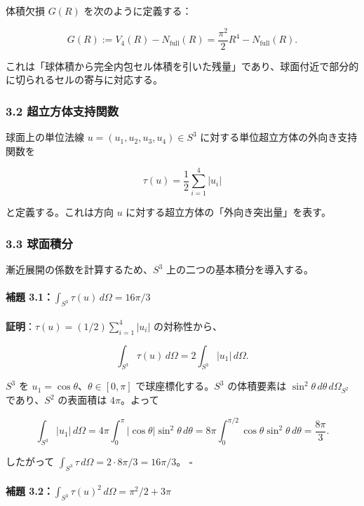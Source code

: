 \documentclass[
]{article}
\begin{document}
体積欠損 \(G(R)\) を次のように定義する：

\[G(R) := V_4(R) - N_{\text{full}}(R) = \frac{\pi^2}{2}R^4 - N_{\text{full}}(R). \tag{3.1}\]

これは「球体積から完全内包セル体積を引いた残量」であり、球面付近で部分的に切られるセルの寄与に対応する。

\subsubsection{3.2
超立方体支持関数}\label{ux8d85ux7acbux65b9ux4f53ux652fux6301ux95a2ux6570}

球面上の単位法線 \(u = (u_1, u_2, u_3, u_4) \in S^3\)
に対する単位超立方体の外向き支持関数を

\[\tau(u) = \frac{1}{2}\sum_{i=1}^{4} |u_i| \tag{3.2}\]

と定義する。これは方向 \(u\) に対する超立方体の「外向き突出量」を表す。

\subsubsection{3.3 球面積分}\label{ux7403ux9762ux7a4dux5206}

漸近展開の係数を計算するため、\(S^3\) 上の二つの基本積分を導入する。

\paragraph{\texorpdfstring{補題
3.1：\(\int_{S^3} \tau(u) \, d\Omega = 16\pi/3\)}{補題 3.1：\textbackslash int\_\{S\^{}3\} \textbackslash tau(u) \textbackslash, d\textbackslash Omega = 16\textbackslash pi/3}}\label{ux88dcux984c-3.1int_s3-tauu-domega-16pi3}

\textbf{証明}：\(\tau(u) = (1/2)\sum_{i=1}^4 |u_i|\) の対称性から、

\[\int_{S^3} \tau(u) \, d\Omega = 2 \int_{S^3} |u_1| \, d\Omega.\]

\(S^3\) を \(u_1 = \cos\theta\)、\(\theta \in [0, \pi]\)
で球座標化する。\(S^3\) の体積要素は
\(\sin^2\theta \, d\theta \, d\Omega_{S^2}\) であり、\(S^2\) の表面積は
\(4\pi\)。よって

\[\int_{S^3} |u_1| \, d\Omega = 4\pi \int_0^\pi |\cos\theta| \sin^2\theta \, d\theta = 8\pi \int_0^{\pi/2} \cos\theta \sin^2\theta \, d\theta = \frac{8\pi}{3}.\]

したがって \(\int_{S^3} \tau \, d\Omega = 2 \cdot 8\pi/3 = 16\pi/3\)。
\(\square\)

\paragraph{\texorpdfstring{補題
3.2：\(\int_{S^3} \tau(u)^2 \, d\Omega = \pi^2/2 + 3\pi\)}{補題 3.2：\textbackslash int\_\{S\^{}3\} \textbackslash tau(u)\^{}2 \textbackslash, d\textbackslash Omega = \textbackslash pi\^{}2/2 + 3\textbackslash pi}}\label{ux88dcux984c-3.2int_s3-tauu2-domega-pi22-3pi}
\end{document}
